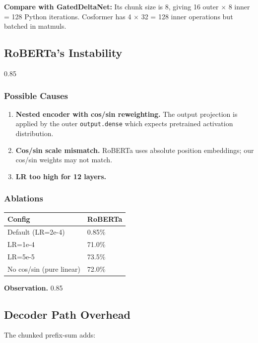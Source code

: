 \textbf{Compare with GatedDeltaNet:} Its chunk size is 8, giving 16 outer $\times$ 8 inner = 128 Python iterations. Cosformer has 4 $\times$ 32 = 128 inner operations but batched in matmuls.

\subsection{RoBERTa's Instability}

0.85

\subsubsection{Possible Causes}

\begin{enumerate}
\item \textbf{Nested encoder with cos/sin reweighting.} The output projection is
  applied by the outer \texttt{output.dense} which expects pretrained activation
  distribution.
\item \textbf{Cos/sin scale mismatch.} RoBERTa uses absolute position embeddings;
  our cos/sin weights may not match.
\item \textbf{LR too high for 12 layers.}

\end{enumerate}
\subsubsection{Ablations}

\begin{table}[H]
\centering
\small
\begin{tabular}{ll}
\toprule
\textbf{Config} & \textbf{RoBERTa} \\
\midrule
Default (LR=2e-4) & 0.85\% \\
LR=1e-4 & 71.0\% \\
LR=5e-5 & 73.5\% \\
No cos/sin (pure linear) & 72.0\% \\
\bottomrule
\end{tabular}
\end{table}

\textbf{Observation.} 0.85

\subsection{Decoder Path Overhead}

The chunked prefix-sum adds:

